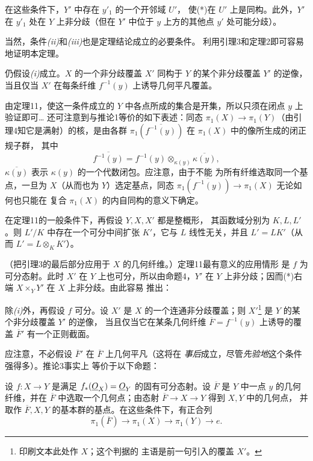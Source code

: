  在这些条件下，$Y'$ 中存在 $y'_1$ 的一个开邻域 $U'$，
使(*)在 $U'$ 上是同构。此外，$Y'$ 在 $y'_1$ 处在 $Y$ 上非分歧（但在
$Y'$ 中位于 $y$ 上方的其他点 $y'$ 处可能分歧）。

当然，条件\textit{(ii)}和\textit{(iii)}也是定理结论成立的必要条件。
利用引理3和定理2即可容易地证明本定理。

 仍假设\textit{(i)}成立。$X$ 的一个非分歧覆盖 $X'$
同构于 $Y$ 的某个非分歧覆盖 $Y'$ 的逆像，当且仅当 $X'$ 在每条纤维
$f^{-1}(y)$ 上诱导几何平凡覆盖。

由定理11，使这一条件成立的 $Y$ 中各点所成的集合是开集，所以只须在闭点
$y$ 上验证即可\ldots{} 还可注意到与推论1等价的如下表述：同态
$\pi_1(X)\longrightarrow\pi_1(Y)$（由引理4知它是满射）的核，是由各群
$\pi_1(\overline{f^{-1}(y)})$ 在 $\pi_1(X)$ 中的像所生成的闭正规子群，
其中
\[
  \overline{f^{-1}(y)}
  =f^{-1}(y)\otimes_{\kappa(y)}\overline{\kappa(y)},
\]
$\overline{\kappa(y)}$ 表示 $\kappa(y)$ 的一个代数闭包。应注意，由于不能
为所有纤维选取同一个基点，一旦为 $X$（从而也为 $Y$）选定基点，同态
$\pi_1(\overline{f^{-1}(y)})\longrightarrow\pi_1(X)$ 无论如何也只能在
复合 $\pi_1(X)$ 的内自同构的意义下确定。

 在定理11的一般条件下，再假设 $Y,X,X'$ 都是整概形，
其函数域分别为 $K,L,L'$。则 $L'/K$ 中存在一个可分中间扩张 $K'$，它与
$L$ 线性无关，并且 $L'=LK'$（从而 $L'=L\otimes_K K'$）。

（把引理3的最后部分应用于 $X$ 的几何纤维。）定理11最有意义的应用情形
是 $f$ 为可分态射。此时 $X'$ 在 $Y$ 上也可分，所以由命题4，$Y'$ 在
$Y$ 上非分歧；因而(*)右端 $X\times_Y Y'$ 在 $X$ 上非分歧。由此容易
推出：

 除\textit{(i)}外，再假设 $f$ 可分。设 $X'$ 是 $X$
的一个连通非分歧覆盖；则 $X'$\footnote{印刷文本此处作 $X$；这个判据的
主语是前一句引入的覆盖 $X'$。} 是 $Y$ 的某个非分歧覆盖 $Y'$ 的逆像，
当且仅当它在某条几何纤维 $\overline F=f^{-1}(y)$ 上诱导的覆盖
$\overline F'$ 有一个正则截面。

应注意，不必假设 $\overline F'$ 在 $\overline F$ 上几何平凡（这将在
\textit{事后}成立，尽管\textit{先验地}这个条件强得多）。推论3事实上
等价于以下命题：

 设 $f:X\longrightarrow Y$ 是满足
$f_*(\underline{O}_X)=\underline{O}_Y$ 的固有可分态射。设 $\overline F$ 是 $Y$ 中一点
$y$ 的几何纤维，并在 $\overline F$ 中选取一个几何点；由态射
$\overline F\longrightarrow X\longrightarrow Y$ 得到 $X,Y$ 中的几何点，
并取作 $\overline F,X,Y$ 的基本群的基点。在这些条件下，有正合列
\[
  \boxed{
    \pi_1(\overline F)\longrightarrow\pi_1(X)
    \longrightarrow\pi_1(Y)\longrightarrow e
  }.
\]

